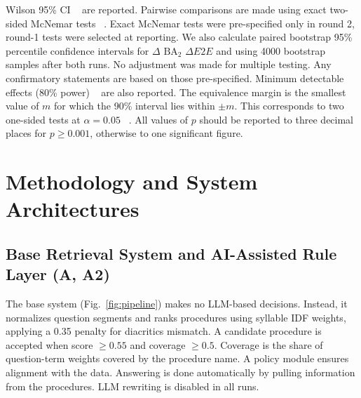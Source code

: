 \documentclass[runningheads]{llncs}
\newcommand{\BA}{\ensuremath{\mathrm{BA}_2}}
\begin{document}
{Wilson 95\% CI ~\cite{wilson1927} are reported. Pairwise comparisons are made using exact two-sided McNemar tests ~\cite{mcnemar1947,dietterich1998}. Exact McNemar tests were pre-specified only in round 2, round-1 tests were selected at reporting. We also calculate paired bootstrap 95\% percentile confidence intervals for $\Delta$ \BA{} $\Delta E2E$ and using 4000 bootstrap samples after both runs. No adjustment was made for multiple testing. Any confirmatory statements are based on those pre-specified. Minimum detectable effects (80\% power) ~\cite{connor1987} are also reported. The equivalence margin is the smallest value of $m$ for which the 90\% interval lies within $\pm m$. This corresponds to two one-sided tests at $\alpha=0.05$ ~\cite{schuirmann1987}. All values of $p$ should be reported to three decimal places for $p\geq0.001$, otherwise to one significant figure.}

\section{Methodology and System Architectures}\label{sec:systems}

\subsection{Base Retrieval System and AI-Assisted Rule Layer (A, A2)}

{The base system (Fig.~\ref{fig:pipeline}) makes no LLM-based decisions. Instead, it normalizes question segments and ranks procedures using syllable IDF weights, applying a 0.35 penalty for diacritics mismatch. A candidate procedure is accepted when score $\geq 0.55$ and coverage $\geq 0.5$. Coverage is the share of question-term weights covered by the procedure name. A policy module ensures alignment with the data. Answering is done automatically by pulling information from the procedures. LLM rewriting is disabled in all runs.}
\end{document}
